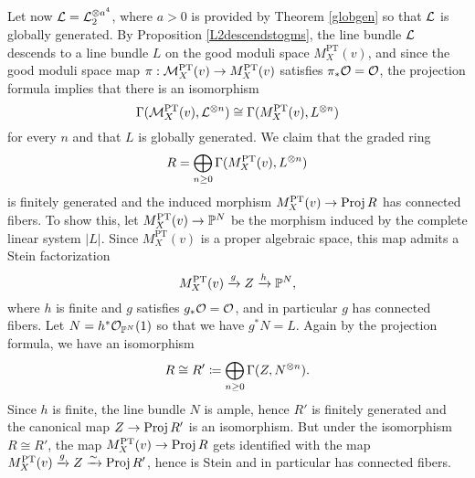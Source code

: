 Let now $\mathcal{L} = \mathcal{L}_2^{\otimes a^4}$, where $a > 0$ is provided by Theorem \ref{globgen} so that $\mathcal{L}$ is globally generated. By Proposition \ref{L2descendstogms}, the line bundle $\mathcal{L}$ descends to a line bundle $L$ on the good moduli space $M^{\text{PT}}_X(v)$, and since the good moduli space map $\pi: \mathcal{M}^{\text{PT}}_X(v) \to M^{\text{PT}}_X(v)$ satisfies $\pi_*\mathcal{O} = \mathcal{O}$, the projection formula implies that there is an isomorphism
\[ \Gamma(\mathcal{M}^{\text{PT}}_X(v), \mathcal{L}^{\otimes n}) \cong \Gamma(M^{\text{PT}}_X(v), L^{\otimes n}) \]
for every $n$ and that $L$ is globally generated. We claim that the graded ring
\[ R = \bigoplus_{n\ge 0} \Gamma(M^{\text{PT}}_X(v), L^{\otimes n}) \]
is finitely generated and the induced morphism $M^{\text{PT}}_X(v) \to \operatorname{\mathrm{Proj}} R$ has connected fibers. To show this, let $M^{\text{PT}}_X(v) \to \mathbb{P}^N$ be the morphism induced by the complete linear system $|L|$. Since $M^{\text{PT}}_X(v)$ is a proper algebraic space, this map admits a Stein factorization
\[ M^{\text{PT}}_X(v) \xrightarrow{g} Z \xrightarrow{h} \mathbb{P}^N, \]
where $h$ is finite and $g$ satisfies $g_*\mathcal{O} = \mathcal{O}$, and in particular $g$ has connected fibers. Let $N = h^*\mathcal{O}_{\mathbb{P}^N}(1)$ so that we have $g^*N = L$. Again by the projection formula, we have an isomorphism
\[ R \cong R' \coloneqq \bigoplus_{n\ge 0} \Gamma(Z, N^{\otimes n}). \]
Since $h$ is finite, the line bundle $N$ is ample, hence $R'$ is finitely generated and the canonical map $Z \to \operatorname{\mathrm{Proj}} R'$ is an isomorphism. But under the isomorphism $R \cong R'$, the map $M^{\text{PT}}_X(v) \to \operatorname{\mathrm{Proj}} R$ gets identified with the map $M^{\text{PT}}_X(v) \xrightarrow{g} Z \xrightarrow{\sim} \operatorname{\mathrm{Proj}} R'$, hence is Stein and in particular has connected fibers.

